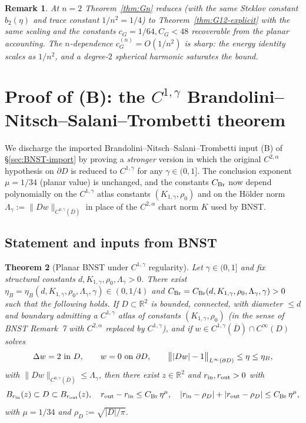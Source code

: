 \documentclass[11pt]{amsart}
\newtheorem{theorem}{Theorem}[section]
\newtheorem{remark}[theorem]{Remark}
\newcommand{\R}{\mathbb R}
\begin{document}
\begin{remark}\label{rem:Gn-pln}
At $n=2$ Theorem~\ref{thm:Gn} reduces (with the same Steklov
constant $b_2(\eta)$ and trace constant $1/n^2=1/4$) to
Theorem~\ref{thm:G12-explicit} with the same scaling and the
constants $c_G=1/64,C_G<48$ recoverable from the planar accounting.
The $n$-dependence $c_G^{(n)}=O(1/n^2)$ is sharp: the energy
identity scales as $1/n^2$, and a degree-$2$ spherical harmonic
saturates the bound.
\end{remark}

\section{Proof of (B): the \texorpdfstring{$C^{1,\gamma}$}{C(1,gamma)}
Brandolini--Nitsch--Salani--Trombetti theorem}\label{sec:BNST-proof}

We discharge the imported Brandolini--Nitsch--Salani--Trombetti
input (B) of \S\ref{sec:BNST-import} by proving a \emph{stronger}
version in which the original $C^{2,\alpha}$ hypothesis on $\partial
D$ is reduced to $C^{1,\gamma}$ for any $\gamma\in(0,1]$.  The
conclusion exponent $\mu=1/34$ (planar value) is unchanged, and the
constants $C_{\rm Br}$ now depend polynomially on the $C^{1,\gamma}$
atlas constants $(K_{1,\gamma},\rho_0)$ and on the Hölder norm
$\Lambda_\gamma:=\|Dw\|_{C^{0,\gamma}(\overline D)}$ in place of the
$C^{2,\alpha}$ chart norm $K$ used by BNST.

\subsection{Statement and inputs from BNST}\label{ss:BNST-Cgamma-stat}

\begin{theorem}[Planar BNST under $C^{1,\gamma}$ regularity]
\label{thm:BNST-Cgamma}
Let $\gamma\in(0,1]$ and fix structural constants $d, K_{1,\gamma},
\rho_0, \Lambda_\gamma>0$.  There exist
$\eta_B=\eta_B(d,K_{1,\gamma},\rho_0,\Lambda_\gamma,\gamma)\in(0,1/4)$
and $C_{\rm Br}=C_{\rm Br}(d,K_{1,\gamma},\rho_0,\Lambda_\gamma,
\gamma)>0$ such that the following holds.  If $D\subset\R^2$ is
bounded, connected, with diameter $\le d$ and boundary admitting a
$C^{1,\gamma}$ atlas of constants $(K_{1,\gamma},\rho_0)$
\textup{(in the sense of BNST Remark~7 with $C^{2,\alpha}$ replaced by
$C^{1,\gamma}$)}, and if $w\in C^{1,\gamma}(\overline D)\cap C^\infty(D)$
solves
\begin{equation}\label{eq:BNST-Cgamma-eq}
   \Delta w=2\ \hbox{in }D,\qquad w=0\ \hbox{on }\partial D,
   \qquad \bigl\||Dw|-1\bigr\|_{L^\infty(\partial D)}\le \eta\le\eta_B,
\end{equation}
with $\|Dw\|_{C^{0,\gamma}(\overline D)}\le\Lambda_\gamma$, then there
exist $z\in\R^2$ and $r_{\rm in},r_{\rm out}>0$ with
\begin{equation}\label{eq:BNST-Cgamma-concl}
   B_{r_{\rm in}}(z)\subset D\subset B_{r_{\rm out}}(z),\quad
   r_{\rm out}-r_{\rm in}\le C_{\rm Br}\,\eta^{\mu},\quad
   |r_{\rm in}-\rho_D|+|r_{\rm out}-\rho_D|\le C_{\rm Br}\,\eta^\mu,
\end{equation}
with $\mu=1/34$ and $\rho_D:=\sqrt{|D|/\pi}$.
\end{theorem}
\end{document}
